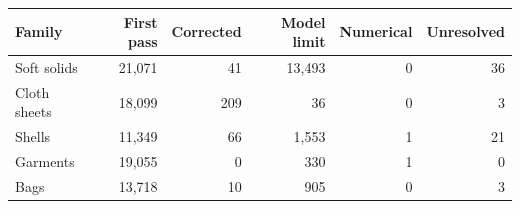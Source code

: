 \begin{tabular}{lrrrrr}
\toprule
Family & First pass & Corrected & Model limit & Numerical & Unresolved \\
\midrule
Soft solids & 21,071 & 41 & 13,493 & 0 & 36 \\
Cloth sheets & 18,099 & 209 & 36 & 0 & 3 \\
Shells & 11,349 & 66 & 1,553 & 1 & 21 \\
Garments & 19,055 & 0 & 330 & 1 & 0 \\
Bags & 13,718 & 10 & 905 & 0 & 3 \\
\bottomrule
\end{tabular}
